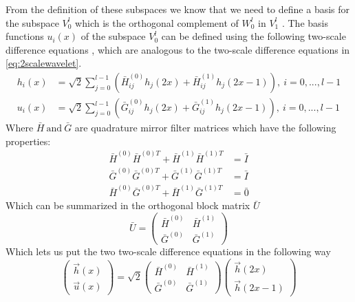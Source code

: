 \documentclass[../master_thesis.tex]{subfiles}
\begin{document}
From the definition of these subspaces
we know that we need to define a basis for the subspace $V^l_0$ which is the
orthogonal complement of $W_0^l$ in $V^l_1$ \cite{Alpert1993}. The basis functions
$u_i(x)$ of the subspace $V^l_0$ can be defined using the following two-scale
difference equations \cite{Beylkin1999AdaptiveSO}, which are analogous to the
two-scale difference equations in \ref{eq:2scalewavelet}.
\begin{align}
  h_i(x) &= \sqrt{2}\sum^{l-1}_{j=0}\left(\bar{H}^{(0)}_{ij}h_j(2x) + \bar{H}^{(1)}_{ij}h_j(2x-1)\right), \ i = 0,...,l-1 \\
  u_i(x) &= \sqrt{2}\sum^{l-1}_{j=0}\left(\bar{G}^{(0)}_{ij}h_j(2x) + \bar{G}^{(1)}_{ij}h_j(2x-1)\right), \ i = 0,...,l-1
\end{align}
Where $ \bar{H} \ \text{and}\ \bar{G} $ are quadrature mirror filter matrices \cite{Beylkin1999AdaptiveSO} which have
the following properties:
\begin{align}
  \bar{H}^{(0)}\bar{H}^{(0)T} + \bar{H}^{(1)}\bar{H}^{(1)T} &= \bar{I} \\
  \bar{G}^{(0)}\bar{G}^{(0)T} + \bar{G}^{(1)}\bar{G}^{(1)T} &= \bar{I} \\
  \bar{H}^{(0)}\bar{G}^{(0)T} + \bar{H}^{(1)}\bar{G}^{(1)T} &= \bar{0}
\end{align}
Which can be summarized in the orthogonal block matrix $\bar{U}$ \cite{Beylkin1999AdaptiveSO}
\begin{equation}
  \bar{U} =
  \begin{pmatrix}
    \bar{H}^{(0)} & \bar{H}^{(1)} \\
    \bar{G}^{(0)} & \bar{G}^{(1)}
  \end{pmatrix}
\end{equation}
Which lets us put the two two-scale difference equations in the following way \cite{Sorland}
\begin{equation}
  \begin{pmatrix}
    \vec{h}(x) \\
    \vec{u}(x)
  \end{pmatrix}
  = \sqrt{2}
  \begin{pmatrix}
    \bar{H}^{(0)} & \bar{H}^{(1)} \\
    \bar{G}^{(0)} & \bar{G}^{(1)}
  \end{pmatrix}
  \begin{pmatrix}
    \vec{h}(2x) \\
    \vec{h}(2x-1)
  \end{pmatrix}
\end{equation}
\end{document}
